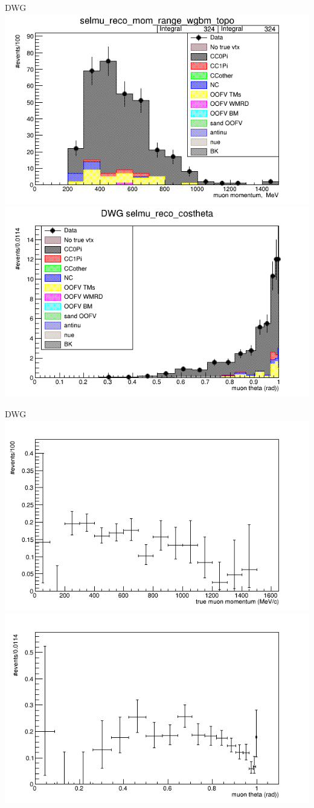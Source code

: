 \documentclass{beamer}
\begin{document}
\begin{frame}{DWG}
\center
\includegraphics[width=.45\textwidth]{images/selmu_reco_mom_range_DWG_wgbm_topo_accum_level[][26]_data_mc.png}
\includegraphics[width=.45\textwidth]{images/selmu_reco_costheta_wgbm_topo_DWG_accum_level[][26]_data_mc.png}
\end{frame}
\begin{frame}{DWG}
\center
\includegraphics[width=.45\textwidth]{images/Eff_selmu_true_mom_wgbm_topo_DWG_accum_level[][26]_data_mc.png}
\includegraphics[width=.45\textwidth]{images/Eff_selmu_true_costheta_wgbm_topo_DWG_accum_level[][26]_data_mc.png}
\end{frame}
\end{document}
